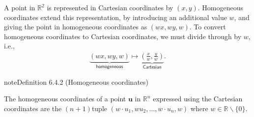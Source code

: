 \documentclass[letterpaper,10pt,english]{jupyterBook}
\begin{document}
\sphinxAtStartPar
A point in \(\mathbb{R}^2\) is represented in Cartesian co\sphinxhyphen{}ordinates by \((x, y)\). Homogeneous co\sphinxhyphen{}ordinates extend this representation, by introducing an additional value \(w\), and giving the point in homogeneous co\sphinxhyphen{}ordinates as \((wx, wy, w)\). To convert homogeneous co\sphinxhyphen{}ordinates to Cartesian co\sphinxhyphen{}ordinates, we must divide through by \(w\), i.e.,
\begin{equation*}
\begin{split}\underbrace{(wx, wy, w)}_{\textsf{homogeneous}} \mapsto \underbrace{\left( \frac{x}{w}, \frac{y}{w} \right)}_{\textsf{Cartesian}}.\end{split}
\end{equation*}\label{_pages/6.4_Translation:homogeneous-co-ordinates-definition}
\begin{sphinxadmonition}{note}{Definition 6.4.2 (Homogeneous co\sphinxhyphen{}ordinates)}



\sphinxAtStartPar
The homogeneous co\sphinxhyphen{}ordinates of a point \(\mathbf{u}\) in \(\mathbb{R}^n\) expressed using the Cartesian co\sphinxhyphen{}ordinates are the \((n+1)\)\sphinxhyphen{}tuple \((w \cdot u_1, w u_2, \ldots, w \cdot u_n, w)\) where \(w \in \mathbb{R}\backslash \{0\}\).
\end{sphinxadmonition}
\end{document}
